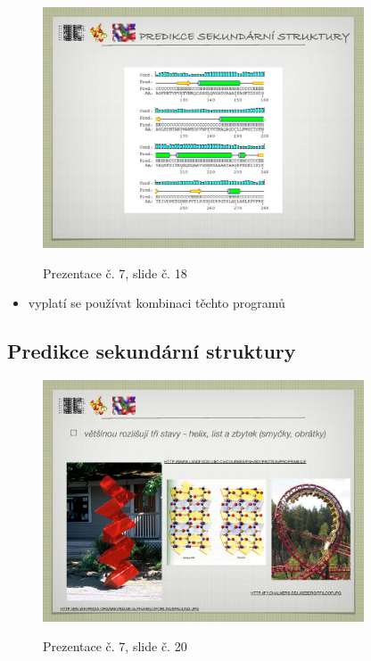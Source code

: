 \documentclass[DIV=8]{scrreprt}
\begin{document}
\begin{itemize}[nosep]
\begin{figure}
    \centering
    \label{slides-7-slide-17}
\end{figure}
\begin{figure}
    \caption{Prezentace č. 7, slide č. 18}
    \includegraphics[width=0.85\textwidth]{slides-7/slide-18.jpg}
    \centering
    \label{slides-7-slide-18}
\end{figure}

\begin{itemize}[nosep]
    \item vyplatí se používat kombinaci těchto programů
\end{itemize}

\end{itemize}



\subsection{Predikce sekundární struktury} \label{Predikce sekundární struktury}


\begin{figure}
    \caption{Prezentace č. 7, slide č. 20}
    \includegraphics[width=0.85\textwidth]{slides-7/slide-20.jpg}
    \centering
    \label{slides-7-slide-20}
\end{figure}
\end{document}
